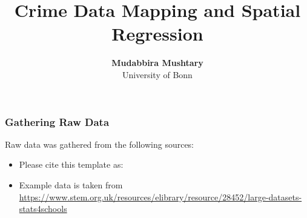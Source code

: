 \documentclass[10pt, aspectratio=169]{beamer}
\begin{document}
\title{Crime Data Mapping and Spatial Regression}

\author[Mudabbira Mushtary]
{
{\bf Mudabbira Mushtary}\\
{\small University of Bonn}\\[1ex]
}


\begin{frame}
    \titlepage
    \note{~}
\end{frame}

\begin{frame}[t]
    \frametitle{Gathering Raw Data}
    Raw data was gathered from the following sources:
    \begin{itemize}
        \item Please cite this template as: \citet{GaudeckerEconProjectTemplates}
        \item Example data is taken from \url{https://www.stem.org.uk/resources/elibrary/resource/28452/large-datasets-stats4schools}
    \end{itemize}
    \note{~}
\end{frame}




\end{document}

